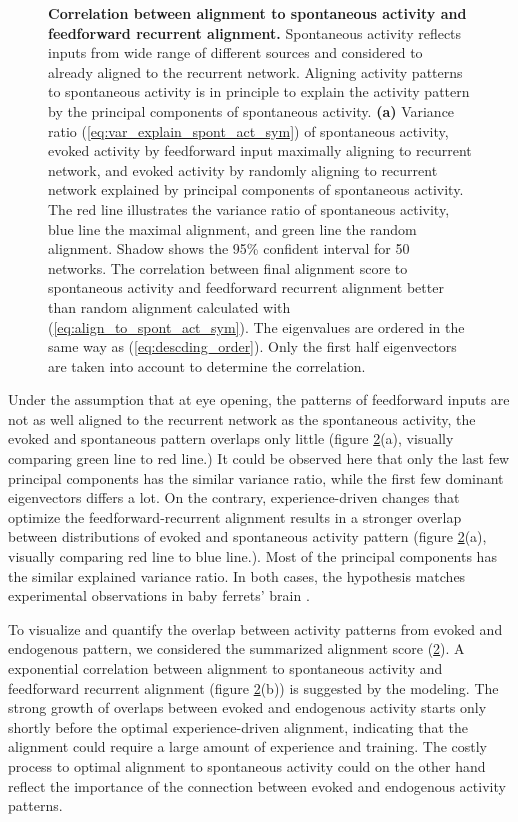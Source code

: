 \documentclass[11pt]{article}
\begin{document}
\begin{figure}[H]
\begin{subfigure}[b]{0.45\textwidth}
				\caption{}
				\label{fig:align_spont_sym}
			\end{subfigure}
			\caption{\textbf{Correlation between alignment to spontaneous activity and feedforward recurrent alignment.} Spontaneous activity reflects inputs from wide range of different sources and considered to already aligned to the recurrent network\cite{tragenap2023nature}. Aligning activity patterns to spontaneous activity is in principle to explain the activity pattern by the principal components of spontaneous activity. \textbf{(a)} Variance ratio (\ref{eq:var_explain_spont_act_sym}) of spontaneous activity, evoked activity by feedforward input maximally aligning to recurrent network, and evoked activity by randomly aligning to recurrent network explained by principal components of spontaneous activity. The red line illustrates the variance ratio of spontaneous activity, blue line the maximal alignment, and green line the random alignment. Shadow shows the 95\% confident interval for 50 networks.  The correlation between final alignment score to spontaneous activity and feedforward recurrent alignment better than random alignment calculated with (\ref{eq:align_to_spont_act_sym}). The eigenvalues are ordered in the same way as (\ref{eq:descding_order}). Only the first half eigenvectors are taken into account to determine the correlation.}
			\label{fig:align_spont_act_sym}
		\end{figure}
	
	Under the assumption that at eye opening, the patterns of feedforward inputs are not as well aligned to the recurrent network as the spontaneous activity, the evoked and spontaneous pattern overlaps only little (figure \ref{fig:align_spont_act_sym}(a), visually comparing green line to red line.) It could be observed here that only the last few principal components has the similar variance ratio, while the first few dominant eigenvectors differs a lot. On the contrary, experience-driven changes that optimize the feedforward-recurrent alignment results in a stronger overlap between distributions of evoked and spontaneous activity pattern (figure \ref{fig:align_spont_act_sym}(a), visually comparing red line to blue line.). Most of the principal components has the similar explained variance ratio. In both cases, the hypothesis matches experimental observations in baby ferrets' brain \cite{tragenap2023nature}.
	
	To visualize and quantify the overlap between activity patterns from evoked and endogenous pattern, we considered the summarized alignment score (\ref{fig:align_spont_act_sym}). A exponential correlation between alignment to spontaneous activity and feedforward recurrent alignment (figure \ref{fig:align_spont_act_sym}(b)) is suggested by the modeling. The strong growth of overlaps between evoked and endogenous activity starts only shortly before the optimal experience-driven alignment, indicating that the alignment could require a large amount of experience and training. The costly process to optimal alignment to spontaneous activity could on the other hand reflect the importance of the connection between evoked and endogenous activity patterns. 
	
\end{document}
